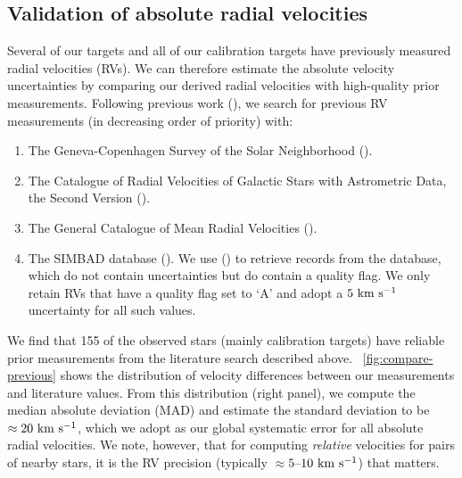 \documentclass[modern, letterpaper]{aastex61}
\begin{document}
\subsection{Validation of absolute radial velocities}\label{sec:rv-validation}

Several of our targets and all of our calibration targets have previously
measured radial velocities (RVs).
We can therefore estimate the absolute velocity uncertainties by comparing our
derived radial velocities with high-quality prior measurements.
Following previous work (\citealt{Shaya:2011}), we search for previous RV
measurements (in decreasing order of priority) with:
\begin{enumerate}
  \item The Geneva-Copenhagen Survey of the Solar Neighborhood
  (\citealt{Nordstrom:2004}).
  \item The Catalogue of Radial Velocities of Galactic Stars with Astrometric
  Data, the Second Version (\citealt{Kharchenko:2007}).
  \item The General Catalogue of Mean Radial Velocities
  (\citealt{Barbier-Brossat:2000}).
  \item The SIMBAD database (\citealt{Wenger:2000}). We use 
  (\citealt{Ginsburg:2016}) to retrieve records from the database, which do not
  contain uncertainties but do contain a quality flag. We only retain RVs that
  have a quality flag set to `A' and adopt a $5~\mathrm{km}~\mathrm{s}^{-1}$ uncertainty for all such
  values.
\end{enumerate}
We find that 155 of the observed stars (mainly calibration targets) have
reliable prior measurements from the literature search described above.
\figurename~\ref{fig:compare-previous} shows the distribution of velocity
differences between our measurements and literature values.
From this distribution (right panel), we compute the median absolute deviation
(MAD) and estimate the standard deviation to be $\approx 20~\mathrm{km}~\mathrm{s}^{-1}$, which we
adopt as our global systematic error for all absolute radial velocities.
We note, however, that for computing \emph{relative} velocities for pairs of
nearby stars, it is the RV precision (typically $\approx 5$--$10~\mathrm{km}~\mathrm{s}^{-1}$) that
matters.
\end{document}

